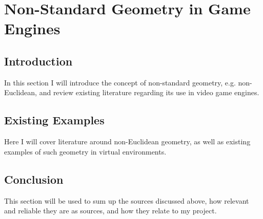 \section{Non-Standard Geometry in Game Engines}
\label{lr:ne}

	\subsection{Introduction}
	\label{lr:ne:intro}
		In this section I will introduce the concept of non-standard geometry, e.g. non-Euclidean, and review existing literature regarding its use in video game engines.
	
	\subsection{Existing Examples}
	\label{lr:ne:existing}
		Here I will cover literature around non-Euclidean geometry, as well as existing examples of such geometry in virtual environments.
		
	\subsection{Conclusion}
	\label{lr:ne:conclusion}
		This section will be used to sum up the sources discussed above, how relevant and reliable they are as sources, and how they relate to my project.
		
